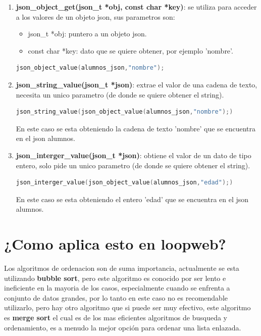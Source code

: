 \begin{enumerate}
    \item  \textbf{json\_object\_get(json\_t *obj, const char *key)}: se utiliza para acceder a los valores de un objeto json, sus parametros son:
    \begin{itemize}
        \item json\_t *obj:  puntero a un objeto json.
        \item const char *key: dato que se quiere obtener, por ejemplo 'nombre'.
    \end{itemize}
    \begin{lstlisting}[style=CodeStyle, language=C, caption={json\_object\_get}, label={lst:codigo}]
        json_object_value(alumnos_json,"nombre");
    \end{lstlisting}
    \item  \textbf{json\_string\_value(json\_t *json)}: extrae el valor de una cadena de texto, necesita un unico parametro (de donde se quiere obtener el string).
    \begin{lstlisting}[style=CodeStyle, language=C, caption={json\_string\_value}, label={lst:codigo}]
        json_string_value(json_object_value(alumnos_json,"nombre");)
    \end{lstlisting}
    En este caso se esta obteniendo la cadena de texto 'nombre' que se encuentra en el json alumnos.
    \item  \textbf{json\_interger\_value(json\_t *json)}: obtiene el valor de un dato de tipo entero, solo pide un unico parametro (de donde se quiere obtener el string).
    \begin{lstlisting}[style=CodeStyle, language=C, caption={json\_interger\_value}, label={lst:codigo}]
        json_interger_value(json_object_value(alumnos_json,"edad");)
    \end{lstlisting}
    En este caso se esta obteniendo el entero 'edad' que se encuentra en el json alumnos.
\end{enumerate}

\section{¿Como aplica esto en loopweb?}
Los algoritmos de ordenacion son de suma importancia, actualmente se esta utilizando \textbf{bubble sort}, pero  este algoritmo es conocido por ser lento e ineficiente en la mayoria de los casos,
especialmente cuando se enfrenta a conjunto de datos grandes, por lo tanto en este caso no es recomendable utilizarlo, pero hay otro algoritmo que si puede ser muy efectivo,
este algoritmo es \textbf{merge sort} el cual es de los mas eficientes algoritmos de busqueda y ordenamiento, es a menudo la mejor opción para ordenar una lista enlazada.

